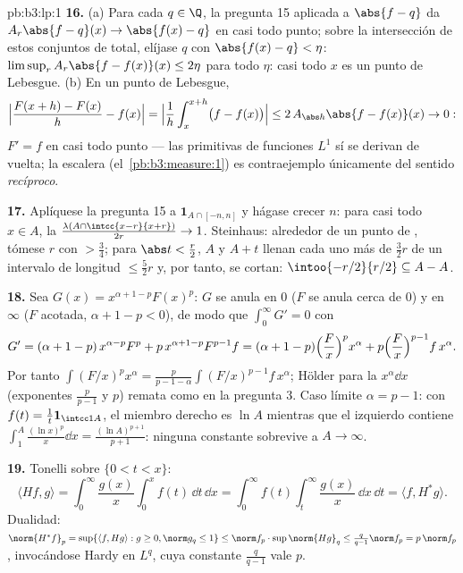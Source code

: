 \begin{solution}{pb:b3:lp:1}
\textbf{16.} (a) Para cada $q \in \Q$, la pregunta 15 aplicada a
$\abs{f - q}$ da $A_r\abs{f - q}(x) \to \abs{f(x) - q}$ en casi todo
punto; sobre la intersección de estos conjuntos de
 total, elíjase $q$ con
$\abs{f(x) - q} < \eta$: $\limsup_rA_r\abs{f - f(x)}(x) \leq 2\eta$ para
todo $\eta$: casi todo $x$ es un punto de Lebesgue. (b) En un punto de
Lebesgue,
\[
\Bigl|\frac{F(x + h) - F(x)}h - f(x)\Bigr|
= \Bigl|\frac1h\int_x^{x+h}\bigl(f - f(x)\bigr)\Bigr|
\leq 2\,A_{\abs h}\abs{f - f(x)}(x) \to 0 :
\]
$F' = f$ en casi todo punto --- las primitivas de funciones $L^1$ sí se
derivan de vuelta; la escalera (el~\cref{pb:b3:measure:1}) es
contraejemplo únicamente del sentido \emph{recíproco}.

\textbf{17.} Aplíquese la pregunta 15 a $\mathbf 1_{A\cap[-n,n]}$ y
hágase crecer $n$: para casi todo $x \in A$, la
$\frac{\lambda(A\cap\intcc{x-r}{x+r})}{2r} \to 1$. Steinhaus: alrededor
de un punto de , tómese $r$ con
 $> \frac34$; para
$\abs t < \frac r2$, $A$ y $A + t$ llenan cada uno más de $\frac32r$ de
un intervalo de longitud $\leq \frac52r$ y, por tanto, se cortan:
$\intoo{-r/2}{r/2} \subseteq A - A$.

\textbf{18.} Sea $G(x) = x^{\alpha+1-p}F(x)^p$: $G$ se anula en $0$ ($F$
se anula cerca de $0$) y en $\infty$ ($F$ acotada,
$\alpha + 1 - p < 0$), de modo que $\int_0^\infty G' = 0$ con
\[
G' = (\alpha + 1 - p)\,x^{\alpha-p}F^p +
p\,x^{\alpha+1-p}F^{p-1}f
= (\alpha + 1 - p)\Bigl(\frac Fx\Bigr)^px^\alpha +
p\Bigl(\frac Fx\Bigr)^{p-1}f\,x^\alpha .
\]
Por tanto $\int(F/x)^px^\alpha = \frac{p}{p-1-\alpha}
\int(F/x)^{p-1}f\,x^\alpha$; Hölder para la
 $x^\alpha\dd x$ (exponentes
$\frac p{p-1}$ y $p$) remata como en la pregunta 3. Caso límite
$\alpha = p - 1$: con $f(t) =
\frac1t\mathbf 1_{\intcc1A}$, el miembro derecho es $\ln A$ mientras que
el izquierdo contiene $\int_1^A\frac{(\ln x)^p}x\dd x =
\frac{(\ln A)^{p+1}}{p+1}$: ninguna constante sobrevive a $A \to
\infty$.

\textbf{19.} Tonelli sobre $\{0 < t < x\}$:
\[
\langle Hf, g\rangle =
\int_0^\infty\frac{g(x)}x\int_0^xf(t)\,\dd t\,\dd x
= \int_0^\infty f(t)\int_t^\infty\frac{g(x)}x\,\dd x\,\dd t
= \langle f, H^*g\rangle .
\]
Dualidad: $\norm{H^*f}_p = \sup\{\langle f, Hg\rangle : g
\geq 0, \norm g_q \leq 1\} \leq \norm f_p\cdot
\sup\norm{Hg}_q \leq \frac q{q-1}\norm f_p = p\,\norm f_p$, invocándose
Hardy en $L^q$, cuya constante $\frac q{q-1}$ vale $p$.


\end{solution}

